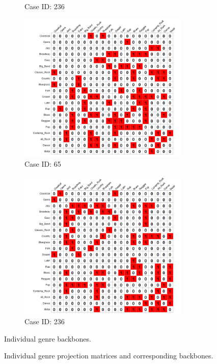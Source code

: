 \documentclass[12pt]{article}
\begin{document}
\begin{figure}[ht!]
\begin{subfigure}[b]{0.49\textwidth}
            \caption{Case ID: 236}
            \label{fig:ind-ex-rp2}
    \end{subfigure}
     \begin{subfigure}[b]{0.49\textwidth}
        \includegraphics[trim={1cm 0cm 0cm 0cm},clip, width=0.9\textwidth]{Plots/data-ex-rbb1.png}
            \caption{Case ID: 65}
            \label{fig:ind-ex-rbb1}
    \end{subfigure}
     \begin{subfigure}[b]{0.49\textwidth}
        \includegraphics[trim={1cm 0cm 0cm 0cm},clip, width=0.9\textwidth]{Plots/data-ex-rbb2.png}
            \caption{Case ID: 236}
            \label{fig:ind-ex-rbb2}
    \end{subfigure}
    \caption{Individual genre backbones.}
    \caption{Individual genre projection matrices and corresponding backbones.}
    \label{fig:ind-ex-rp}
\end{figure}
\end{document}
